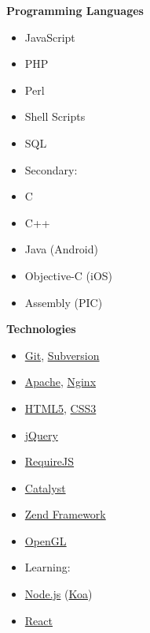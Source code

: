 \noindent
\begin{minipage}[t]{.3\linewidth}
\vspace{0pt}
\textbf{Programming Languages}
\begin{itemize}[itemsep=0pt]    %
    \item JavaScript
    \item PHP
    \item Perl
    \item Shell Scripts
    \item SQL
    \item[] \hspace*{-2em} Secondary:
    \item C
    \item C++
    \item Java (Android)
    \item Objective-C (iOS)
    \item Assembly (PIC)
\end{itemize}
\end{minipage}
%
\hfill
%
\begin{minipage}[t]{.25\linewidth}
\vspace{0pt}
\textbf{Technologies}
\begin{itemize}[itemsep=0pt]
    \item \href{http://git-scm.com}{Git},
          \href{http://subversion.apache.org}{Subversion}
    \item \href{http://httpd.apache.org}{Apache},
          \href{http://nginx.com}{Nginx}
    \item \href{http://www.w3.org/html/wg/drafts/html/master/Overview.html}{HTML5},
          \href{http://www.w3.org/Style/CSS}{CSS3}
    \item \href{http://jquery.com}{jQuery}
    \item \href{http://requirejs.org}{RequireJS}
    \item \href{http://catalystframework.org}{Catalyst}
    \item \href{http://framework.zend.com}{Zend Framework}
    \item \href{http://opengl.org}{OpenGL}
    \item[] \hspace*{-2em} Learning:
    \item \href{http://nodejs.org}{Node.js} (\href{http://koajs.com}{Koa})
    \item \href{http://facebook.github.io/react}{React}
\end{itemize}
\end{minipage}
